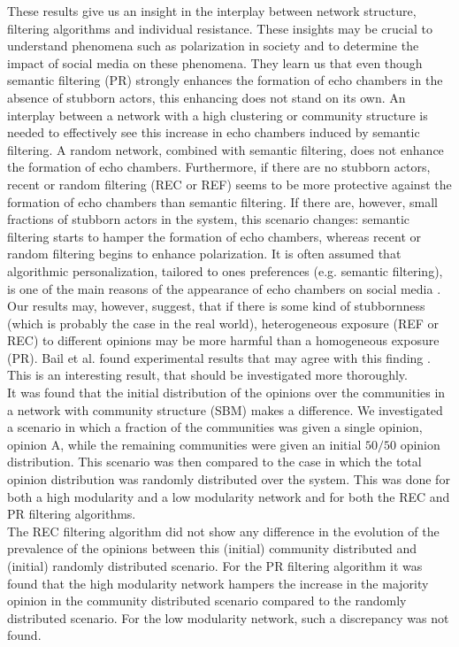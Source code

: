 \documentclass[11 pt , letterpaper , twoside , openright]{book}
\begin{document}
\newline
These results give us an insight in the interplay between network structure, filtering algorithms and individual resistance. These insights may be crucial to understand phenomena such as polarization in society and to determine the impact of social media on these phenomena. They learn us that even though semantic filtering (PR) strongly enhances the formation of echo chambers in the absence of stubborn actors, this enhancing does not stand on its own. An interplay between a network with a high clustering or community structure is needed to effectively see this increase in echo chambers induced by semantic filtering. A random network, combined with semantic filtering, does not enhance the formation of echo chambers. Furthermore, if there are no stubborn actors, recent or random filtering (REC or REF) seems to be more protective against the formation of echo chambers than semantic filtering. If there are, however, small fractions of stubborn actors in the system, this scenario changes: semantic filtering starts to hamper the formation of echo chambers, whereas recent or random filtering begins to enhance polarization. It is often assumed that algorithmic personalization, tailored to ones preferences (e.g. semantic filtering), is one of the main reasons of the appearance of echo chambers on social media \cite{Ge2020}\cite{Mohseni2018}\cite{Stark2020}. Our results may, however, suggest, that if there is some kind of stubbornness (which is probably the case in the real world), heterogeneous exposure (REF or REC) to different opinions may be more harmful than a homogeneous exposure (PR). Bail et al. found experimental results that may agree with this finding \cite{Bail2018}. This is an interesting result, that should be investigated more thoroughly.\\
\newline
It was found that the initial distribution of the opinions over the communities in a network with community structure (SBM) makes a difference. We investigated a scenario in which a fraction of the communities was given a single opinion, opinion A, while the remaining communities were given an initial $50/50$ opinion distribution. This scenario was then compared to the case in which the total opinion distribution was randomly distributed over the system. This was done for both a high modularity and a low modularity network and for both the REC and PR filtering algorithms. \\
\newline
The REC filtering algorithm did not show any difference in the evolution of the prevalence of the opinions between this (initial) community distributed and (initial) randomly distributed scenario. For the PR filtering algorithm it was found that the high modularity network hampers the increase in the majority opinion in the community distributed scenario compared to the randomly distributed scenario. For the low modularity network, such a discrepancy was not found.\\
\end{document}
